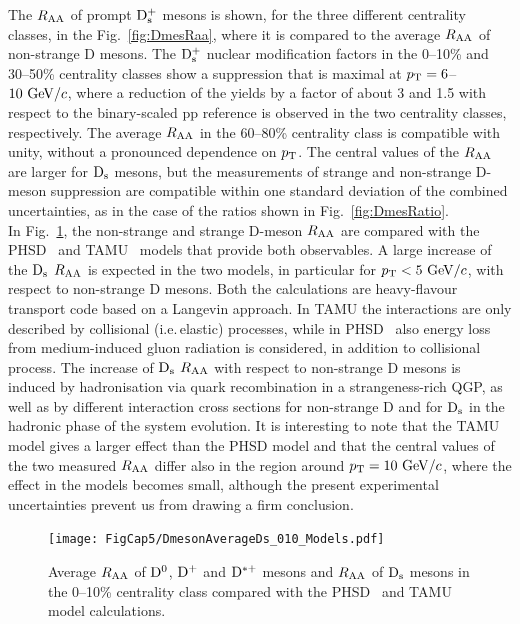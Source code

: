 The $R_{\rm AA}$ of prompt ${\rm D_s^+}$ mesons is shown, for the three different centrality classes,
in the Fig.~\ref{fig:DmesRaa}, where it is compared to the average $R_{\rm AA}$ of non-strange 
D mesons. The ${\rm D_s^+}$ nuclear modification factors in the 0--10\% 
and 30--50\% centrality classes show a suppression that is
maximal at $p_{\rm T}=6$--$10~\mathrm{GeV}/c$, where a reduction of the yields by
a factor of about 3 and 1.5 with respect to the binary-scaled
 pp reference is observed in the two centrality classes, respectively.
The average $R_{\rm AA}$ in the 60--80\% centrality class is compatible 
with unity, without a pronounced dependence on $p_{\rm T}$.
 The central values of the $R_{\rm AA}$ are larger for ${\rm D_s}$ mesons, but the measurements 
 of strange and non-strange D-meson suppression are 
compatible within one standard deviation of the combined 
uncertainties, as in the case of the ratios shown in Fig.~\ref{fig:DmesRatio}.\\




In Fig.~\ref{fig:DandDsRaaWithModels},  the non-strange and 
strange D-meson $R_{\rm AA}$ are compared with  
the PHSD~\cite{Song:2015ykw} and 
 TAMU~\cite{He:2014cla} models that provide both observables. A large increase of
 the ${\rm D_s}$ $R_{\rm AA}$ is expected in the two models, in particular for $p_{\rm T}<5~\mathrm{GeV}/c$, with respect to 
 non-strange D mesons. Both the calculations are heavy-flavour transport code
 based on a Langevin approach.
In TAMU the interactions are only described by collisional (i.e.\,elastic) processes, 
while in PHSD~\cite{Song:2015ykw} also energy loss from medium-induced gluon radiation
is considered, in addition to collisional process.
The increase of ${\rm D_s}$ $R_{\rm AA}$ with respect to non-strange D mesons is induced by hadronisation 
 via quark recombination in a strangeness-rich QGP, as well as by different 
interaction cross sections for non-strange D and for ${\rm D_s}$ in 
the hadronic phase of the system evolution. It is interesting
 to note that the TAMU model gives a larger effect than the 
 PHSD model and that the central values of the two measured $R_{\rm AA}$ differ also 
in the region around $p_{\rm T}=10~\mathrm{GeV}/c$, where the effect in the 
models becomes small, although the present experimental 
uncertainties prevent us from drawing a firm conclusion. \\


\begin{figure}[!t]
 \begin{center}
\texttt{[image: FigCap5/DmesonAverageDs\_010\_Models.pdf]}
 \end{center}
 \caption{Average $R_{\rm AA}$ of ${\rm D^0}$, ${\rm D^+}$ and ${\rm D^{*+}}$ mesons and $R_{\rm AA}$ of ${\rm D_s}$ mesons in the 0--10\% centrality class compared with the PHSD~\cite{Song:2015ykw}  and TAMU~\cite{He:2014cla} model calculations.}
 \label{fig:DandDsRaaWithModels} 
\end{figure} 




